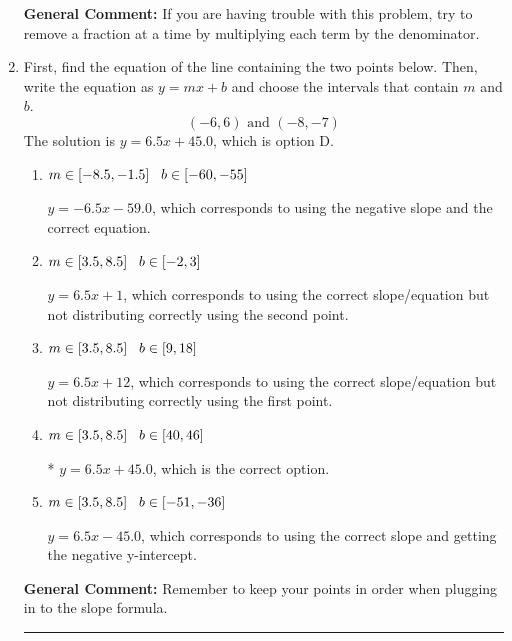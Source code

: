 \documentclass{extbook}[14pt]
\newcommand{\litem}[1]{\item #1

\rule{\textwidth}{0.4pt}}
\begin{document}
\begin{enumerate}
{\textbf{General Comment:} If you are having trouble with this problem, try to remove a fraction at a time by multiplying each term by the denominator.
}
\litem{
First, find the equation of the line containing the two points below. Then, write the equation as $ y=mx+b $ and choose the intervals that contain $m$ and $b$.
\[ (-6, 6) \text{ and } (-8, -7) \]The solution is \( y = 6.5x + 45.0 \), which is option D.\begin{enumerate}[label=\Alph*.]
\item \( m \in [-8.5, -1.5] \hspace*{3mm} b \in [-60, -55] \)

 $y = -6.5x -59.0$, which corresponds to using the negative slope and the correct equation.
\item \( m \in [3.5, 8.5] \hspace*{3mm} b \in [-2, 3] \)

 $y = 6.5x + 1$, which corresponds to using the correct slope/equation but not distributing correctly using the second point.
\item \( m \in [3.5, 8.5] \hspace*{3mm} b \in [9, 18] \)

 $y = 6.5x + 12$, which corresponds to using the correct slope/equation but not distributing correctly using the first point.
\item \( m \in [3.5, 8.5] \hspace*{3mm} b \in [40, 46] \)

* $y = 6.5x + 45.0$, which is the correct option.
\item \( m \in [3.5, 8.5] \hspace*{3mm} b \in [-51, -36] \)

 $y = 6.5x -45.0$, which corresponds to using the correct slope and getting the negative y-intercept.
\end{enumerate}

\textbf{General Comment:} Remember to keep your points in order when plugging in to the slope formula.
}
\end{enumerate}
\end{document}
